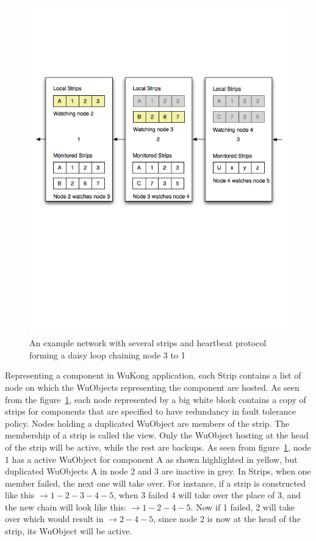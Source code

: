 \begin{figure}[h!]
\centering
    \includegraphics[width=\linewidth]{figures/strip1}
\caption{An example network with several strips and heartbeat protocol forming
  a daisy loop chaining node 3 to 1}
\label{fig:strip1}
\end{figure}

Representing a component in WuKong application, each Strip contains a list of
node on which the WuObjects representing the component are hosted. As seen from
the figure~\ref{fig:strip1}, each node represented by a big white block contains
a copy of strips for components that are specified to have redundancy in fault
tolerance policy. Nodes holding a duplicated WuObject are members of the strip.
The membership of a strip is called the view. Only the WuObject hosting at the
head of the strip will be active, while the rest are backups.  As seen from
figure~\ref{fig:strip1}, node 1 has a active WuObject for component A as shown
highlighted in yellow, but duplicated WuObjects A in node 2 and 3 are inactive
in grey. In Strips, when one member failed, the next one will take over. For
instance, if a strip is constructed like this $\rightarrow 1-2-3-4-5$, when
3 failed 4 will take over the place of 3, and the new chain will look like this:
$\rightarrow 1-2-4-5$. Now if 1 failed, 2 will take over which would result in
$\rightarrow 2-4-5$, since node 2 is now at the head of the strip, its WuObject
will be active. 

